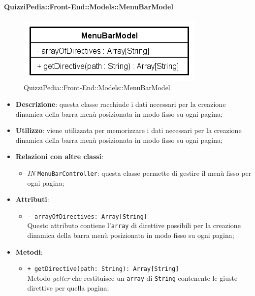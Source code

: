 \paragraph{QuizziPedia::Front-End::Models::MenuBarModel}
		
		\label{QuizziPedia::Front-End::Models::MenuBarModel}
		
		\begin{figure}[ht]
			\centering
			\includegraphics[scale=0.5,keepaspectratio]{UML/Classi/Front-End/QuizziPedia_Front-end_Models_MenuBarModel.png}
			\caption{QuizziPedia::Front-End::Models::MenuBarModel}
		\end{figure} \FloatBarrier
		
		\begin{itemize}
			\item \textbf{Descrizione}: questa classe racchiude i dati necessari per la creazione dinamica della barra menù posizionata in modo fisso su ogni pagina;
			\item \textbf{Utilizzo}: viene utilizzata per memorizzare i dati necessari per la creazione dinamica della barra menù posizionata in modo fisso su ogni pagina;
			\item \textbf{Relazioni con altre classi}: 
			\begin{itemize}
				\item \textit{IN} \texttt{MenuBarController}: questa classe permette di gestire il menù fisso per ogni pagina;
			\end{itemize}
			\item \textbf{Attributi}: 
			\begin{itemize}
				\item \texttt{- arrayOfDirectives: Array[String]}\\
				Questo attributo contiene l'\texttt{array} di direttive possibili per la creazione dinamica della barra menù posizionata in modo fisso su ogni pagina;
			\end{itemize}
			\item \textbf{Metodi}: 
			\begin{itemize}
				\item \texttt{+ getDirective(path: String): Array[String]} \\
				Metodo \textit{getter} che restituisce un \texttt{array} di \texttt{String} contenente le giuste direttive per quella pagina;
			\end{itemize}
		\end{itemize}		
		
		
		